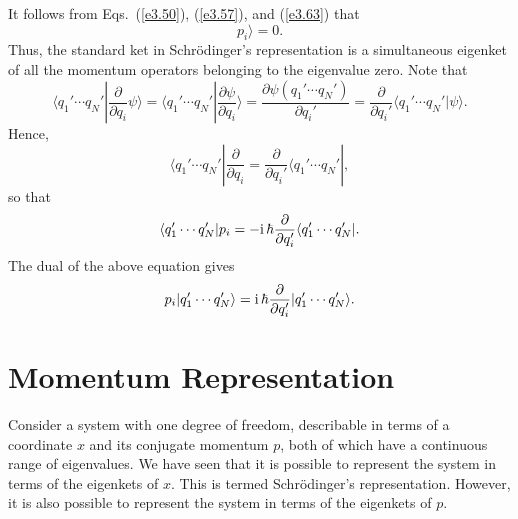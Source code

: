 It follows from Eqs.~(\ref{e3.50}), (\ref{e3.57}), and (\ref{e3.63}) that
\begin{equation}
p_i \rangle = 0.
\end{equation}
Thus, the standard ket in Schr\"{o}dinger's representation is a simultaneous eigenket
of all the momentum operators belonging to the eigenvalue zero. Note that
\begin{equation}
\langle q_1'\cdots q_N'|\frac{\partial}{\partial q_i} \psi\rangle = 
\langle q_1'\cdots q_N'| \frac{\partial \psi}{\partial q_i}\rangle 
=\frac{\partial \psi(q_1'\cdots q_N')}{\partial q_i'} = \frac{\partial }
{\partial q_i'}\langle q_1'\cdots q_N'|\psi\rangle.
\end{equation}
Hence,
\begin{equation}
\langle q_1'\cdots q_N'| \frac{\partial}{\partial q_i} = 
\frac{\partial}{\partial q_i'} \langle q_1'\cdots q_N'|,
\end{equation}
so that
\begin{equation}\label{e3.67}
\langle q_1'\cdots q_N'| p_i = -{\rm i}\,\hbar\frac{\partial}{\partial q_i'}
\langle q_1'\cdots q_N'|.
\end{equation}
The dual of the above equation gives
\begin{equation}
p_i|q_1'\cdots q_N'\rangle = {\rm i}\,\hbar\frac{\partial}{\partial q_i'} |q_1'\cdots
q_N'\rangle.
\end{equation}

\section{Momentum Representation}
Consider a system with one degree of freedom, describable in terms of a coordinate
$x$ and its conjugate momentum $p$, both of which have a continuous range of
eigenvalues. We have seen that it is possible to represent the system in terms
of the eigenkets of $x$. 
This is termed Schr\"{o}dinger's representation.
However, it is also possible to represent the system in 
terms of the eigenkets of $p$. 

